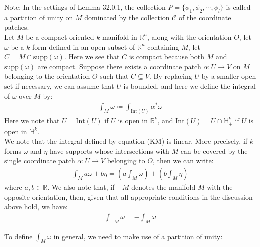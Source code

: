 \documentclass[11pt,oneside]{book}
\theoremstyle{break}
\theoremstyle{break}
\newcommand{\R}{\mathbb{R}}
\newcommand{\C}{\mathcal{C}}
\newcommand{\note}{\color{red}Note: \color{black}}
\begin{document}
\note In the settings of Lemma 32.0.1, the collection $P = \{ \phi_1, \phi_2,\cdots, \phi_l\}$ is called a partition of unity on $M$ dominated by the collection $\C$ of the coordinate patches.\\

Let $M$ be a compact oriented $k$-manifold in $\R^n$, along with the orientation $O$, let $\omega$ be a $k$-form defined in an open subset of $\R^n$ containing $M$, let $C = M \cap \text{supp}(\omega)$. Here we see that $C$ is compact because both $M$ and $\text{supp}(\omega)$ are compact. Suppose there exists a coordinate patch $\alpha:U \to V$ on $M$ belonging to the orientation $O$ such that $C \subseteq V$. By replacing $U$ by a smaller open set if necessary, we can assume that $U$ is bounded, and here we define the integral of $\omega$ over $M$ by:
\begin{align*}
\int_M \omega \coloneqq \int_{\text{Int}(U)}\alpha^*\omega \tag{KM}
\end{align*}
Here we note that $U = \text{Int}(U)$ if $U$ is open in $\R^k$, and $\text{Int}(U) = U \cap \mathbb{H}_+^k$ if $U$ is open in $\mathbb{H}^k$.\\

We note that the integral defined by equation (KM) is linear. More precisely, if $k$-forms $\omega$ and $\eta$ have supports whose intersections with $M$ can be covered by the single coordinate patch $\alpha:U \to V$ belonging to $O$, then we can write:
\begin{align*}
\int_M a\omega+ b \eta =\left( a \int_M \omega\right) + \left(b \int_M \eta\right)
\end{align*}
where $a,b \in \R$. We also note that, if $-M$ denotes the manifold $M$ with the opposite orientation, then, given that all appropriate conditions in the discussion above hold, we have:
\begin{align*}
\int_{-M}\omega  = -\int_M \omega
\end{align*}

To define $\int_M \omega$ in general, we need to make use of a partition of unity:
\end{document}
